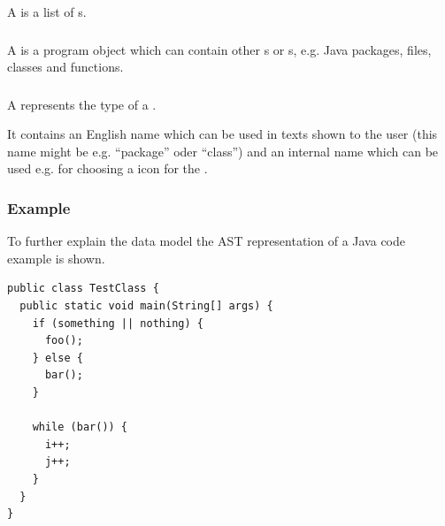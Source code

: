 A  is a list of s.

\subsubsection[HierarchyLevel]{}


A  is a program object which can contain other
s or s, e.g. Java packages, files,
classes and functions.

\subsubsection[HierarchyLevelType]{}


A  represents the type of a .

It contains an English name which can be used in texts shown to the user
(this name might be e.g. ``package'' oder ``class'') and an internal name
which can be used e.g. for choosing a icon for the .

\subsubsection{Example}

To further explain the data model the AST representation of a Java code example
is shown.

\begin{verbatim}
public class TestClass {
  public static void main(String[] args) {
    if (something || nothing) {
      foo();
    } else {
      bar();
    }
    
    while (bar()) {
      i++;
      j++;
    }
  }
}
\end{verbatim}

